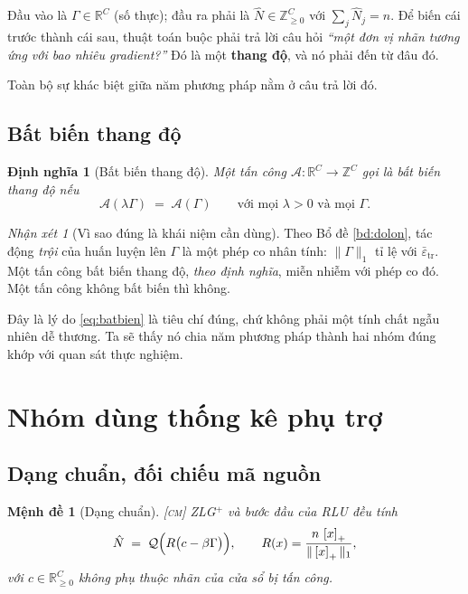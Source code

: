 \documentclass[11pt,a4paper]{article}
\newtheorem{menhde}[dinhly]{Mệnh đề}
\newtheorem{dinhnghia}[dinhly]{Định nghĩa}
\theoremstyle{remark}
\newtheorem{nhanxet}[dinhly]{Nhận xét}
\newcommand{\R}{\mathbb{R}}
\newcommand{\pos}[1]{\left[#1\right]_+}
\newcommand{\quant}{\mathcal{Q}}
\newcommand{\epstr}{\bar\varepsilon_{\mathrm{tr}}}
\begin{document}
Đầu vào là $\Gamma\in\R^C$ (số thực); đầu ra phải là $\hat N\in\mathbb{Z}^C_{\ge0}$
với $\sum_j\hat N_j=n$. Để biến cái trước thành cái sau, thuật toán buộc phải
trả lời câu hỏi \emph{``một đơn vị nhãn tương ứng với bao nhiêu gradient?''}
Đó là một \textbf{thang độ}, và nó phải đến từ đâu đó.

Toàn bộ sự khác biệt giữa năm phương pháp nằm ở câu trả lời đó.

\subsection{Bất biến thang độ}

\begin{dinhnghia}[Bất biến thang độ]
\label{dn:batbien}
Một tấn công $\mathcal{A}:\R^C\to\mathbb{Z}^C$ gọi là \emph{bất biến thang độ}
nếu
\begin{equation}
\mathcal{A}(\lambda\Gamma)\;=\;\mathcal{A}(\Gamma)
\qquad\text{với mọi } \lambda>0 \text{ và mọi } \Gamma .
\label{eq:batbien}
\end{equation}
\end{dinhnghia}

\begin{nhanxet}[Vì sao đúng là khái niệm cần dùng]
\label{nx:visaobatbien}
Theo Bổ đề \ref{bd:dolon}, tác động \emph{trội} của huấn luyện lên $\Gamma$ là
một phép co nhân tính: $\|\Gamma\|_1$ tỉ lệ với $\epstr$. Một tấn công bất
biến thang độ, \emph{theo định nghĩa}, miễn nhiễm với phép co đó. Một tấn
công không bất biến thì không.

Đây là lý do \eqref{eq:batbien} là tiêu chí đúng, chứ không phải một tính
chất ngẫu nhiên dễ thương. Ta sẽ thấy nó chia năm phương pháp thành hai nhóm
đúng khớp với quan sát thực nghiệm.
\end{nhanxet}

\section{Nhóm dùng thống kê phụ trợ}
\label{sec:aux}

\subsection{Dạng chuẩn, đối chiếu mã nguồn}

\begin{menhde}[Dạng chuẩn]
\label{md:dangchuan}
\textsc{[cm]}\; ZLG$^+$ và bước đầu của RLU đều tính
\begin{equation}
\hat N \;=\; \quant\Bigl(R\bigl(c-\beta\Gamma\bigr)\Bigr),
\qquad R(x)=\frac{n\,\pos{x}}{\|\pos{x}\|_1},
\label{eq:dangchuan}
\end{equation}
với $c\in\R^C_{\ge0}$ \emph{không phụ thuộc nhãn của cửa sổ bị tấn công}.
\end{menhde}
\end{document}

